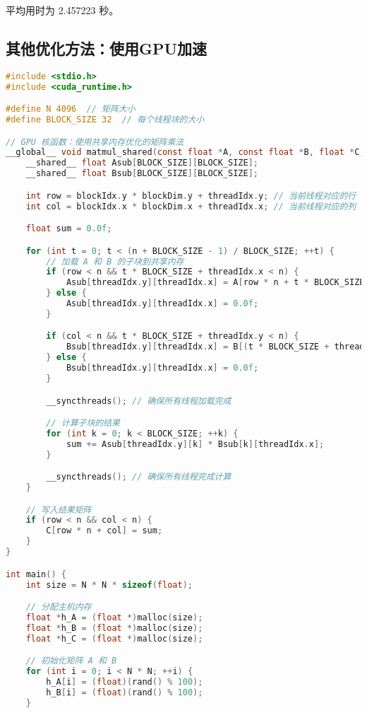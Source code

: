 \documentclass[a4paper,12pt]{ctexart}
\begin{document}
平均用时为 2.457223 秒。

\subsection{其他优化方法：使用GPU加速}
\begin{lstlisting}[language=C, caption={使用CUDA进行矩阵乘法}]
#include <stdio.h>
#include <cuda_runtime.h>

#define N 4096  // 矩阵大小
#define BLOCK_SIZE 32  // 每个线程块的大小

// GPU 核函数：使用共享内存优化的矩阵乘法
__global__ void matmul_shared(const float *A, const float *B, float *C, int n) {
    __shared__ float Asub[BLOCK_SIZE][BLOCK_SIZE];
    __shared__ float Bsub[BLOCK_SIZE][BLOCK_SIZE];

    int row = blockIdx.y * blockDim.y + threadIdx.y; // 当前线程对应的行
    int col = blockIdx.x * blockDim.x + threadIdx.x; // 当前线程对应的列

    float sum = 0.0f;

    for (int t = 0; t < (n + BLOCK_SIZE - 1) / BLOCK_SIZE; ++t) {
        // 加载 A 和 B 的子块到共享内存
        if (row < n && t * BLOCK_SIZE + threadIdx.x < n) {
            Asub[threadIdx.y][threadIdx.x] = A[row * n + t * BLOCK_SIZE + threadIdx.x];
        } else {
            Asub[threadIdx.y][threadIdx.x] = 0.0f;
        }

        if (col < n && t * BLOCK_SIZE + threadIdx.y < n) {
            Bsub[threadIdx.y][threadIdx.x] = B[(t * BLOCK_SIZE + threadIdx.y) * n + col];
        } else {
            Bsub[threadIdx.y][threadIdx.x] = 0.0f;
        }

        __syncthreads(); // 确保所有线程加载完成

        // 计算子块的结果
        for (int k = 0; k < BLOCK_SIZE; ++k) {
            sum += Asub[threadIdx.y][k] * Bsub[k][threadIdx.x];
        }

        __syncthreads(); // 确保所有线程完成计算
    }

    // 写入结果矩阵
    if (row < n && col < n) {
        C[row * n + col] = sum;
    }
}

int main() {
    int size = N * N * sizeof(float);

    // 分配主机内存
    float *h_A = (float *)malloc(size);
    float *h_B = (float *)malloc(size);
    float *h_C = (float *)malloc(size);

    // 初始化矩阵 A 和 B
    for (int i = 0; i < N * N; ++i) {
        h_A[i] = (float)(rand() % 100);
        h_B[i] = (float)(rand() % 100);
    }


\end{lstlisting}
\end{document}
